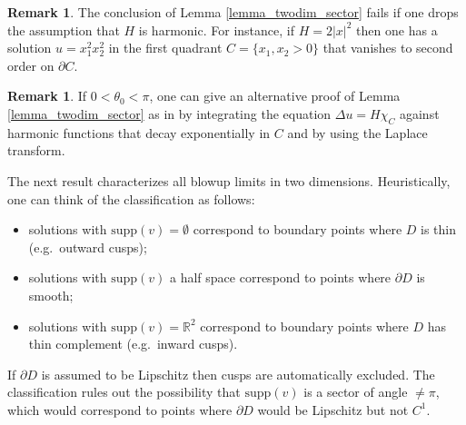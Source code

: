 \documentclass[11pt,a4paper]{amsart}
\theoremstyle{definition}
\newtheorem{Remark}[Theorem]{Remark}
\numberwithin{equation}{section}
\newcommand{\mR}{\mathbb{R}}                    %
\newcommand{\abs}[1]{\lvert #1 \rvert}          %
\newcommand{\supp}{\mathrm{supp}}
\newcommand{\p}{\partial}
\begin{document}
\begin{Remark}
The conclusion of Lemma \ref{lemma_twodim_sector} fails if one drops the assumption that $H$ is harmonic. For instance, if $H = 2 \abs{x}^2$ then one has a solution $u = x_1^2 x_2^2$ in the first quadrant $C = \{ x_1, x_2 > 0 \}$ that vanishes to second order on $\p C$.
\end{Remark}

\begin{Remark}
If $0 < \theta_0 < \pi$, one can give an alternative proof of Lemma \ref{lemma_twodim_sector} as in \cite{PaivarintaSaloVesalainen} by integrating the equation $\Delta u = H \chi_C$ against harmonic functions that decay exponentially in $C$ and by using the Laplace transform.
\end{Remark}





The next result characterizes all blowup limits in two dimensions. Heuristically, one can think of the classification as follows:
\begin{itemize}
\item 
solutions with $\supp(v) = \emptyset$ correspond to boundary points where $D$ is thin (e.g.\ outward cusps);
\item 
solutions with $\supp(v)$ a half space correspond to points where $\p D$ is smooth;
\item 
solutions with $\supp(v) = \mR^2$ correspond to boundary points where $D$ has thin complement (e.g.\ inward cusps).
\end{itemize}
If $\p D$ is assumed to be Lipschitz then cusps are automatically excluded. The classification rules out the possibility that $\supp(v)$ is a sector of angle $\neq \pi$, which would correspond to points where $\p D$ would be Lipschitz but not $C^1$.
\end{document}
